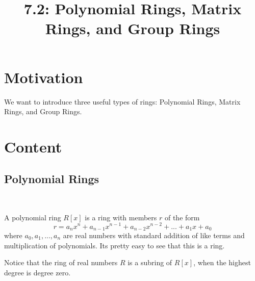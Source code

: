 \documentclass{article}
\title{7.2: Polynomial Rings, Matrix Rings, and Group Rings}
\begin{document}
\maketitle

\section{Motivation}
We want to introduce three useful types of rings: Polynomial Rings, Matrix Rings, and Group Rings.

\section{Content}
\subsection{Polynomial Rings}
\ 

\begin{definition}
A polynomial ring $R[x]$ is a ring with members $r$ of the form $$r = a_nx^n + a_{n-1}x^{n-1} + a_{n-2}x^{n-2} + ... + a_1x + a_0$$where $a_0, a_1, ... ,a_n$ are real numbers with standard addition of like terms and multiplication of polynomials. Its pretty easy to see that this is a ring. 

Notice that the ring of real numbers $R$ is a subring of $R[x]$, when the highest degree is degree zero. 
\end{definition}
\end{document}
